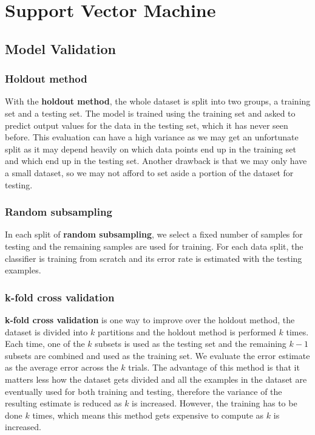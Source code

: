 \documentclass[11pt,fleqn]{book} %
\begin{document}
\chapter{Support Vector Machine}

\section{Model Validation}
\subsection{Holdout method}
With the \textbf{holdout method}, the whole dataset is split into two groups, a training set and a testing set. The model is trained using the training set and asked to predict output values for the data in the testing set, which it has never seen before. This evaluation can have a high variance as we may get an unfortunate split as it may depend heavily on which data points end up in the training set and which end up in the testing set. Another drawback is that we may only have a small dataset, so we may not afford to set aside a portion of the dataset for testing.

\subsection{Random subsampling}
In each split of \textbf{random subsampling}, we select a fixed number of samples for testing and the remaining samples are used for training. For each data split, the classifier is training from scratch and its error rate is estimated with the testing examples.

\subsection{k-fold cross validation}
\textbf{k-fold cross validation} is one way to improve over the holdout method, the dataset is divided into $k$ partitions and the holdout method is performed $k$ times. Each time, one of the $k$ subsets is used as the testing set and the remaining $k - 1$ subsets are combined and used as the training set. We evaluate the error estimate as the average error across the $k$ trials. The advantage of this method is that it matters less how the dataset gets divided and all the examples in the dataset are eventually used for both training and testing, therefore the variance of the resulting estimate is reduced as $k$ is increased. However, the training has to be done $k$ times, which means this method gets expensive to compute as $k$ is increased.
\end{document}
